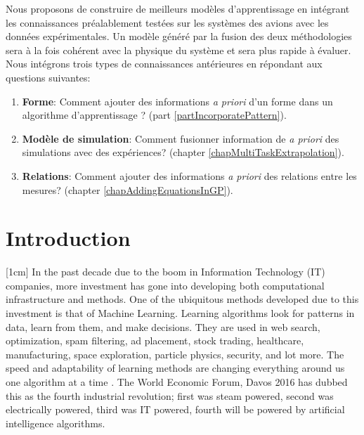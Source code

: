 \begin{mdframed}[hidealllines=true,backgroundcolor=lightgray!20]
Nous proposons de construire de meilleurs modèles d'apprentissage en intégrant les connaissances préalablement testées sur les systèmes des avions avec les données expérimentales. Un modèle généré par la fusion des deux méthodologies sera à la fois cohérent avec la physique du système et sera plus rapide à évaluer. Nous intégrons trois types de connaissances antérieures en répondant aux questions suivantes:

\begin{enumerate}
\item \textbf{Forme}: Comment ajouter des informations \textit{a priori} d'un forme dans un algorithme d'apprentissage ? (part \ref{partIncorporatePattern}).
\item \textbf{Modèle de simulation}: Comment fusionner information de \textit{a priori} des simulations avec des expériences? (chapter \ref{chapMultiTaskExtrapolation}). 
\item \textbf{Relations}: Comment ajouter des informations \textit{a priori} des relations entre les mesures? (chapter \ref{chapAddingEquationsInGP}).
\end{enumerate}


\end{mdframed}



\section{Introduction}
[1cm]
In the past decade due to the boom in Information Technology (IT) companies, more investment has gone into developing both computational infrastructure and methods. One of the ubiquitous methods developed due to this investment is that of Machine Learning. Learning algorithms look for patterns in data, learn from them, and make decisions. They are used in web search, optimization, spam filtering, ad placement, stock trading, healthcare, manufacturing, space exploration, particle physics, security, and lot more. The speed and adaptability of learning methods are changing everything around us one algorithm at a time \cite{domingos2015master}. The World Economic Forum, Davos 2016 \cite{schwab2016fourth} has dubbed this as the fourth industrial revolution; first was steam powered, second was electrically powered, third was IT powered, fourth will be powered by artificial intelligence algorithms.

